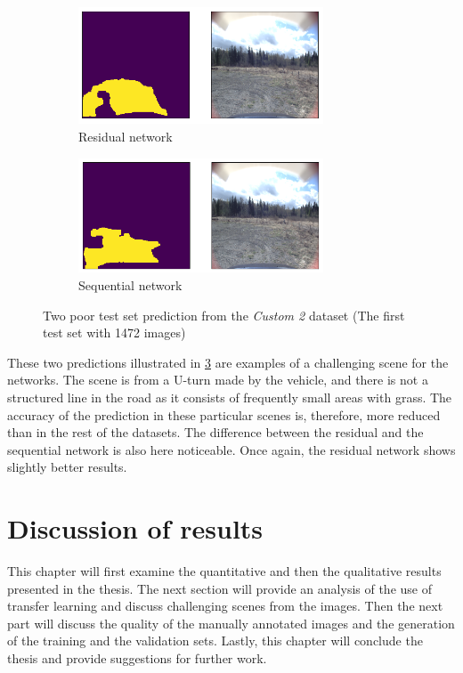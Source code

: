 \documentclass[USenglish]{ifimaster}  %
\begin{document}
\begin{figure}[ht]
\centering
\begin{subfigure}[b]{\textwidth}
\centering
\includegraphics[width=0.8\textwidth]{bilder/custom_2/154_res_poor.png}
\caption{Residual network}
\label{fig:custom_2_poor_res}
\end{subfigure}
\hfill
\begin{subfigure}[b]{\textwidth}
\centering
\includegraphics[width=0.8\textwidth]{bilder/custom_2/154_seq_poor.png}
\caption{Sequential network}
\label{fig:custom_2_poor_seq}
\end{subfigure}
\caption{Two poor test set prediction from the \textit{Custom 2} dataset (The first test set with 1472 images)}
\label{fig:custom_2_poor}
\end{figure}

These two predictions illustrated in \cref{fig:custom_2_poor} are examples of a challenging scene for the networks. The scene is from a U-turn made by the vehicle, and there is not a structured line in the road as it consists of frequently small areas with grass. The accuracy of the prediction in these particular scenes is, therefore, more reduced than in the rest of the datasets. The difference between the residual and the sequential network is also here noticeable. Once again, the residual network shows slightly better results.


\chapter{Discussion of results}\label{discussion}
This chapter will first examine the quantitative and then the qualitative results presented in the thesis. The next section will provide an analysis of the use of transfer learning and discuss challenging scenes from the images. Then the next part will discuss the quality of the manually annotated images and the generation of the training and the validation sets. Lastly, this chapter will conclude the thesis and provide suggestions for further work. 
\end{document}

